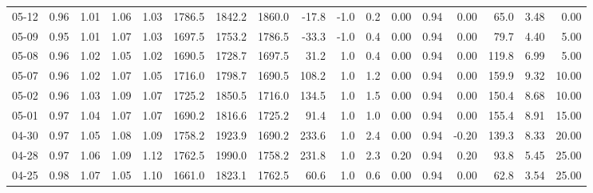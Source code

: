 \begin{threeparttable}
{\begin{tabular}{lrrrrrrrrrrrrrrrr}
  05-12 &         0.96 &           1.01 &          1.06 &          1.03 & 1786.5 & 1842.2 & 1860.0 &      -17.8 &                     -1.0 &                 0.2 &       0.00 &      0.94 &           0.00 &             65.0 &            3.48 &                   0.00 \\
  05-09 &         0.95 &           1.01 &          1.07 &          1.03 & 1697.5 & 1753.2 & 1786.5 &      -33.3 &                     -1.0 &                 0.4 &       0.00 &      0.94 &           0.00 &             79.7 &            4.40 &                   5.00 \\
  05-08 &         0.96 &           1.02 &          1.05 &          1.02 & 1690.5 & 1728.7 & 1697.5 &       31.2 &                      1.0 &                 0.4 &       0.00 &      0.94 &           0.00 &            119.8 &            6.99 &                   5.00 \\
  05-07 &         0.96 &           1.02 &          1.07 &          1.05 & 1716.0 & 1798.7 & 1690.5 &      108.2 &                      1.0 &                 1.2 &       0.00 &      0.94 &           0.00 &            159.9 &            9.32 &                  10.00 \\
  05-02 &         0.96 &           1.03 &          1.09 &          1.07 & 1725.2 & 1850.5 & 1716.0 &      134.5 &                      1.0 &                 1.5 &       0.00 &      0.94 &           0.00 &            150.4 &            8.68 &                  10.00 \\
  05-01 &         0.97 &           1.04 &          1.07 &          1.07 & 1690.2 & 1816.6 & 1725.2 &       91.4 &                      1.0 &                 1.0 &       0.00 &      0.94 &           0.00 &            155.4 &            8.91 &                  15.00 \\
  04-30 &         0.97 &           1.05 &          1.08 &          1.09 & 1758.2 & 1923.9 & 1690.2 &      233.6 &                      1.0 &                 2.4 &       0.00 &      0.94 &          -0.20 &            139.3 &            8.33 &                  20.00 \\
  04-28 &         0.97 &           1.06 &          1.09 &          1.12 & 1762.5 & 1990.0 & 1758.2 &      231.8 &                      1.0 &                 2.3 &       0.20 &      0.94 &           0.20 &             93.8 &            5.45 &                  25.00 \\
  04-25 &         0.98 &           1.07 &          1.05 &          1.10 & 1661.0 & 1823.1 & 1762.5 &       60.6 &                      1.0 &                 0.6 &       0.00 &      0.94 &           0.00 &             62.8 &            3.54 &                  25.00 \\

\end{tabular}}
\end{threeparttable}
